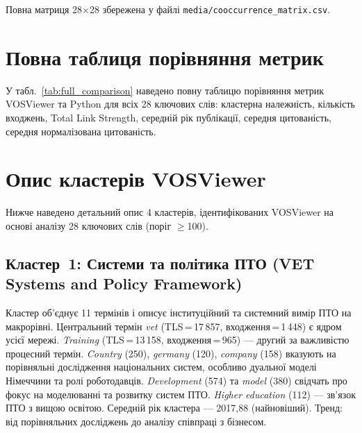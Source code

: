 Повна матриця 28$\times$28 збережена у файлі \texttt{media/cooccurrence\_matrix.csv}.


\section{Повна таблиця порівняння метрик}
\label{app:comparison}

У табл.~\ref{tab:full_comparison} наведено повну таблицю порівняння метрик VOSViewer та Python для всіх 28 ключових слів: кластерна належність, кількість входжень, Total Link Strength, середній рік публікації, середня цитованість, середня нормалізована цитованість.

\begin{landscape}
\begin{table}[htbp]
\centering
\caption{Повна таблиця порівняння метрик VOSViewer та Python.}
\label{tab:full_comparison}
\scriptsize

\end{table}
\end{landscape}


\section{Опис кластерів VOSViewer}
\label{app:clusters}

Нижче наведено детальний опис 4 кластерів, ідентифікованих VOSViewer на основі аналізу 28 ключових слів (поріг $\geq$100).

\subsection*{Кластер~1: Системи та політика ПТО (VET Systems and Policy Framework)}

Кластер об'єднує 11 термінів і описує інституційний та системний вимір ПТО на макрорівні. Центральний термін \textit{vet} (TLS\,=\,17\,857, входження\,=\,1\,448) є ядром усієї мережі. \textit{Training} (TLS\,=\,13\,158, входження\,=\,965) --- другий за важливістю процесний термін. \textit{Country} (250), \textit{germany} (120), \textit{company} (158) вказують на порівняльні дослідження національних систем, особливо дуальної моделі Німеччини та ролі роботодавців. \textit{Development} (574) та \textit{model} (380) свідчать про фокус на моделюванні та розвитку систем ПТО. \textit{Higher education} (112) --- зв'язок ПТО з вищою освітою. Середній рік кластера --- 2017,88 (найновіший). Тренд: від порівняльних досліджень до аналізу співпраці з бізнесом.

